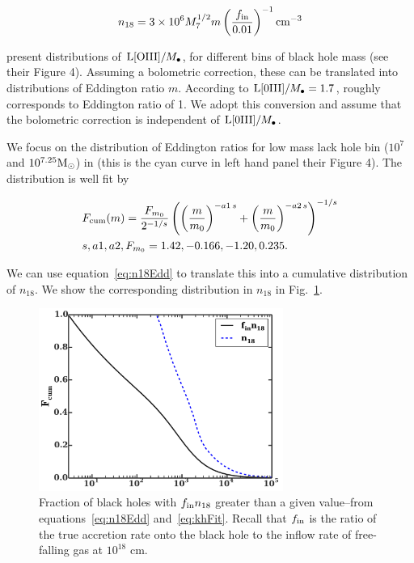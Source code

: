 \documentclass[usenatbib,fleqn]{mnras}
\newcommand\lsim{\mathrel{\rlap{\lower4pt\hbox{\hskip1pt$\sim$}}
    \raise1pt\hbox{$<$}}}
\newcommand\gsim{\mathrel{\rlap{\lower4pt\hbox{\hskip1pt$\sim$}}
    \raise1pt\hbox{$>$}}}
\newcommand{\Mbh}[1][]{M_{\bullet#1}}
\newcommand{\Msun}{{\rm M_\odot}}
\begin{document}
\begin{equation}
n_{18} = 3 \times 10^6 M_7^{1/2} m \left(\frac{f_{\rm in}}{0.01}\right)^{-1} {\rm
  cm}^{-3}
\label{eq:n18Edd}
\end{equation}

\citet{Kauffmann+2009} present distributions of ${\rm L[OIII]}/\Mbh$,
for different bins of black hole mass (see their Figure 4).  Assuming
a bolometric correction, these can be translated into distributions of
Eddington ratio $m$.  According to \citet{Kauffmann+2009} ${\rm
  L[0III]}/\Mbh=1.7$, roughly corresponds to Eddington ratio of 1. We
adopt this conversion and assume that the bolometric correction is
independent of ${\rm L[0III]}/\Mbh$.

We focus on the distribution of Eddington ratios for low mass lack
hole bin ($10^7$ and $10^{7.25} \Msun$) in \citet{Kauffmann+2009}
(this is the cyan curve in left hand panel their Figure 4). The
distribution is well fit by

\begin{align}
  &F_{\rm cum}(m)=\frac{F_{m_0}}{2^{-1/s}}
  \left(\left(\frac{m}{m_0}\right)^{-a1\,
      s}+\left(\frac{m}{m_0}\right)^{-a2 \, s}\right)^{-1/s} \label{eq:khFit}\\
  &s, a1, a2, F_{m_0}=1.42, -0.166, -1.20, 0.235.\nonumber
\end{align}

We can use equation~\eqref{eq:n18Edd} to translate this into a cumulative
distribution of $n_{18}$. We show the corresponding distribution in
$n_{18}$ in Fig.~\ref{fig:n18Cum}.

\begin{figure}
\includegraphics[width=8cm]{fcum_n18.pdf}
\caption{\label{fig:n18Cum} Fraction of black holes with $f_{\rm in}
  n_{18}$ greater than a given value--from equations~\eqref{eq:n18Edd}
  and~\eqref{eq:khFit}. Recall that $f_{\rm in}$ is the ratio of the
  true accretion rate onto the black hole to the inflow rate of
  free-falling gas at $10^{18}$ cm. 
}
\end{figure}
\end{document}
